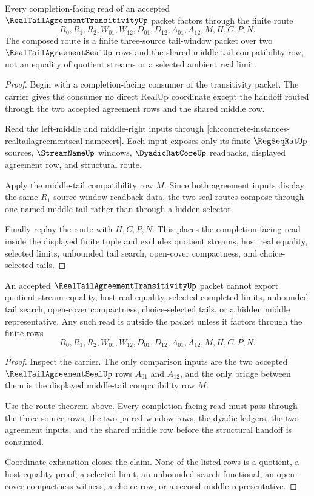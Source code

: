 \begin{theorem}
\label{thm:real-tail-agreement-transitivity-route}
Every completion-facing read of an accepted $\RealTailAgreementTransitivityUp$ packet factors through the finite route
$$
R_0,R_1,R_2,W_{01},W_{12},D_{01},D_{12},A_{01},A_{12},M,H,C,P,N.
$$
The composed route is a finite three-source tail-window packet over two $\RealTailAgreementSealUp$ rows and the shared middle-tail compatibility row, not an equality of quotient streams or a selected ambient real limit.
\end{theorem}
\begin{proof}
Begin with a completion-facing consumer of the transitivity packet. The carrier gives the consumer no direct RealUp coordinate except the handoff routed through the two accepted agreement rows and the shared middle row.

Read the left-middle and middle-right inputs through \autoref{ch:concrete-instances-realtailagreementseal-namecert}. Each input exposes only its finite $\RegSeqRatUp$ sources, $\StreamNameUp$ windows, $\DyadicRatCoreUp$ readbacks, displayed agreement row, and structural route.

Apply the middle-tail compatibility row $M$. Since both agreement inputs display the same $R_1$ source-window-readback data, the two seal routes compose through one named middle tail rather than through a hidden selector.

Finally replay the route with $H,C,P,N$. This places the completion-facing read inside the displayed finite tuple and excludes quotient streams, host real equality, selected limits, unbounded tail search, open-cover compactness, and choice-selected tails.
\end{proof}

\begin{theorem}
\label{thm:real-tail-agreement-transitivity-nonescape}
An accepted $\RealTailAgreementTransitivityUp$ packet cannot export quotient stream equality, host real equality, selected completed limits, unbounded tail search, open-cover compactness, choice-selected tails, or a hidden middle representative. Any such read is outside the packet unless it factors through the finite rows
$$
R_0,R_1,R_2,W_{01},W_{12},D_{01},D_{12},A_{01},A_{12},M,H,C,P,N.
$$
\end{theorem}
\begin{proof}
Inspect the carrier. The only comparison inputs are the two accepted $\RealTailAgreementSealUp$ rows $A_{01}$ and $A_{12}$, and the only bridge between them is the displayed middle-tail compatibility row $M$.

Use the route theorem above. Every completion-facing read must pass through the three source rows, the two paired window rows, the dyadic ledgers, the two agreement inputs, and the shared middle row before the structural handoff is consumed.

Coordinate exhaustion closes the claim. None of the listed rows is a quotient, a host equality proof, a selected limit, an unbounded search functional, an open-cover compactness witness, a choice row, or a second middle representative.
\end{proof}


